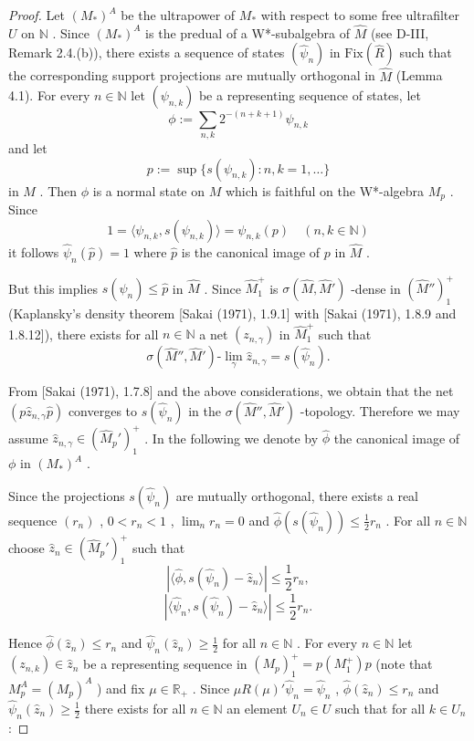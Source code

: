 \begin{proof}
Let $ (M_{*})^{A} $  be the ultrapower of $ M_{*} $  with respect to some free ultrafilter $ U $  on $ \mathbb{N} $ .
Since $ (M_{*})^{A} $  is the predual of a W*-subalgebra of $ \hat{M} $  (see D-III, Remark 2.4.(b)), there exists a sequence of states $ (\hat{\psi}_{n}) $  in $ \text{Fix}(\hat{R}) $  such that the corresponding support projections are mutually orthogonal in $ \hat{M} $  (Lemma 4.1).
For every $ n \in \mathbb{N} $  let $ (\psi_{n,k}) $  be a representing sequence of states, let
\[
\phi := \sum_{n,k} 2^{-(n+k+1)} \psi_{n,k}
\]
and let
\[
p := \sup\{s(\psi_{n,k}): n,k=1,\ldots\}
\]
in $ M $ .
Then $ \phi $  is a normal state on $ M $  which is faithful on the W*-algebra $ M_{p} $ .
Since 
\[
1 = \langle\psi_{n,k},s(\psi_{n,k})\rangle = \psi_{n,k}(p) \quad (n,k \in \mathbb{N})
\]
it follows $ \hat{\psi}_{n}(\hat{p}) = 1 $  where $ \hat{p} $  is the canonical image of $ p $  in $ \hat{M} $ .

\newpage

But this implies $ s(\hat{\psi}_{n}) \leq \hat{p} $  in $ \hat{M} $ .
Since $ \hat{M}_{1}^{+} $  is $ \sigma(\hat{M},\hat{M}') $ -dense in $ (\hat{M}'')_{1}^{+} $  (Kaplansky's density theorem [Sakai (1971), 1.9.1] with [Sakai (1971), 1.8.9 and 1.8.12]), there exists for all $ n \in \mathbb{N} $  a net $ (z_{n,\gamma}) $  in $ \hat{M}_{1}^{+} $  such that
\[
\sigma(\hat{M}'',\hat{M}')\text{-}\lim_{\gamma} \hat{z}_{n,\gamma} = s(\hat{\psi}_{n}).
\]

From [Sakai (1971), 1.7.8] and the above considerations, we obtain that the net $ (p\hat{z}_{n,\gamma}\hat{p}) $  converges to $ s(\hat{\psi}_{n}) $  in the $ \sigma(\hat{M}'',\hat{M}') $ -topology.
Therefore we may assume $ \hat{z}_{n,\gamma} \in (\hat{M}_{p}')_{1}^{+} $ .
In the following we denote by $ \hat{\phi} $  the canonical image of $ \phi $  in $ (M_{*})^{A} $ .

Since the projections $ s(\hat{\psi}_{n}) $  are mutually orthogonal, there exists a real sequence $ (r_{n}) $ , $ 0 < r_{n} < 1 $ , $ \lim_{n} r_{n} = 0 $  and $ \hat{\phi}(s(\hat{\psi}_{n})) \leq \frac{1}{2}r_{n} $ .
For all $ n \in \mathbb{N} $  choose $ \hat{z}_{n} \in (\hat{M}_{p}')_{1}^{+} $  such that
\[
|\langle\hat{\phi},s(\hat{\psi}_{n}) - \hat{z}_{n}\rangle| \leq \frac{1}{2}r_{n},
\]
\[
|\langle\hat{\psi}_{n},s(\hat{\psi}_{n}) - \hat{z}_{n}\rangle| \leq \frac{1}{2}r_{n}.
\]

Hence $ \hat{\phi}(\hat{z}_{n}) \leq r_{n} $  and $ \hat{\psi}_{n}(\hat{z}_{n}) \geq \frac{1}{2} $  for all $ n \in \mathbb{N} $ .
For every $ n \in \mathbb{N} $  let $ (z_{n,k}) \in \hat{z}_{n} $  be a representing sequence in $ (M_{p})_{1}^{+} = p(M_{1}^{+})p $  (note that $ M_{p}^{A} = (M_{p})^{A} $ ) and fix $ \mu \in \mathbb{R}_{+} $ .
Since $ \mu R(\mu)'\hat{\psi}_{n} = \hat{\psi}_{n} $ , $ \hat{\phi}(\hat{z}_{n}) \leq r_{n} $  and $ \hat{\psi}_{n}(\hat{z}_{n}) \geq \frac{1}{2} $  there exists for all $ n \in \mathbb{N} $  an element $ U_{n} \in U $  such that for all $ k \in U_{n} $ :


\end{proof}
